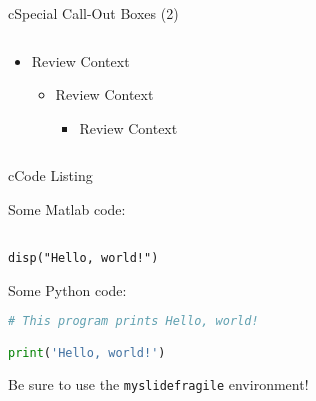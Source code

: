 \begin{myslide}{c}{Special Call-Out Boxes (2)}

\begin{columns}

\begin{column}{1\textwidth}

\begin{itemize}

\item[]
\begin{myoptional}
\lipsum[1][1-6]
\end{myoptional}

\begin{myreview}{Review Context}
\lipsum[2][1-3]
\end{myreview}

\begin{itemize}

\item[]
\begin{myreview}{Review Context}
\lipsum[2][1-3]
\end{myreview}

\begin{itemize}

\item[]
\begin{myreview}{Review Context}
\lipsum[2][1-3]
\end{myreview}

\end{itemize}

\end{itemize}


\end{itemize}

\end{column}

\end{columns}

\end{myslide}


\begin{myslidefragile}{c}{Code Listing}


Some Matlab code:
\begin{lstlisting}[xleftmargin=0pt]
% This program prints Hello, world!

disp("Hello, world!")
\end{lstlisting}

Some Python code:
\begin{lstlisting}[xleftmargin=0pt,language=Python]
# This program prints Hello, world!

print('Hello, world!')
\end{lstlisting}

Be sure to use the \lstinline{myslidefragile} environment!

\end{myslidefragile}


